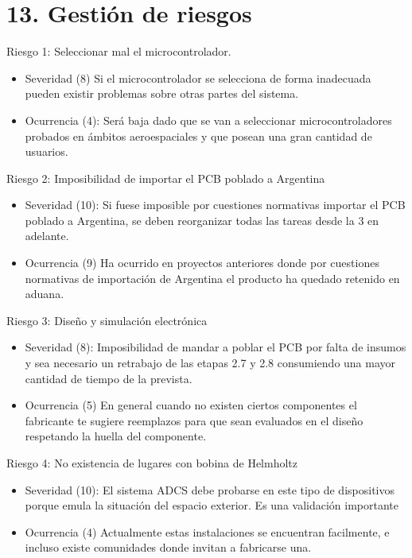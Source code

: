 \documentclass[
11pt, %
]{charter}
\begin{document}
\section{13. Gestión de riesgos}
\label{sec:riesgos}

Riesgo 1: Seleccionar mal el microcontrolador. 
\begin{itemize}
	 \item Severidad (8)
	 \newline Si el microcontrolador se selecciona de forma inadecuada pueden existir problemas sobre otras partes del sistema.  
	 \item Ocurrencia (4):\newline 
	 	Será baja dado que se van a seleccionar microcontroladores probados en ámbitos aeroespaciales y que posean una gran cantidad de usuarios.  
\end{itemize}

Riesgo 2: Imposibilidad de importar el PCB poblado a Argentina
\begin{itemize}
	\item Severidad (10):
	\newline Si fuese imposible por cuestiones normativas importar el PCB poblado a Argentina, se deben reorganizar todas las tareas desde la 3 en adelante.  
	\item Ocurrencia (9)\newline 
	Ha ocurrido en proyectos anteriores donde por cuestiones normativas de importación de Argentina el producto ha quedado retenido en aduana. 
\end{itemize}


Riesgo 3: Diseño y simulación electrónica 
\begin{itemize}
	\item Severidad (8):
	\newline Imposibilidad de mandar a poblar el PCB por falta de insumos y sea necesario un retrabajo de las etapas 2.7 y 2.8 consumiendo una mayor cantidad de tiempo de la prevista.  
	\item Ocurrencia (5)\newline 
	En general cuando no existen ciertos componentes el fabricante te sugiere reemplazos para que sean evaluados en el diseño respetando la huella del componente. 
\end{itemize}

Riesgo 4: No existencia de lugares con bobina de Helmholtz
\begin{itemize}
	\item Severidad (10):
	\newline El sistema ADCS debe probarse en este tipo de dispositivos porque emula la situación del espacio exterior. Es una validación importante  
	\item Ocurrencia (4)\newline 
	Actualmente estas instalaciones se encuentran facilmente, e incluso existe comunidades donde invitan a fabricarse una.  
\end{itemize}
\end{document}
